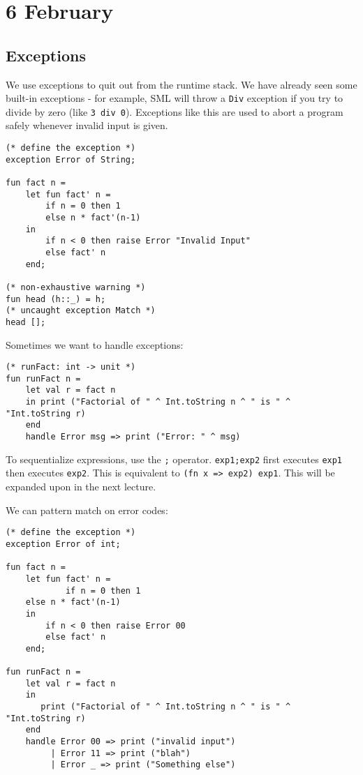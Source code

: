\documentclass[11pt]{article}
\begin{document}
\section{6 February}
\subsection{Exceptions}

We use exceptions to quit out from the runtime stack. We have already seen some built-in exceptions - for example, SML will throw a \verb~Div~ exception if you try to divide by zero (like \verb~3 div 0~). Exceptions like this are used to abort a program safely whenever invalid input is given.

\begin{verbatim}
(* define the exception *)
exception Error of String;

fun fact n =
    let fun fact' n =
        if n = 0 then 1
        else n * fact'(n-1)
    in
        if n < 0 then raise Error "Invalid Input"
        else fact' n
    end;

(* non-exhaustive warning *)
fun head (h::_) = h;
(* uncaught exception Match *)
head []; 
\end{verbatim}

Sometimes we want to handle exceptions:

\begin{verbatim}
(* runFact: int -> unit *)
fun runFact n =
    let val r = fact n
    in print ("Factorial of " ^ Int.toString n ^ " is " ^ "Int.toString r)
    end
    handle Error msg => print ("Error: " ^ msg)
\end{verbatim}

To sequentialize expressions, use the \verb~;~ operator. \verb~exp1;exp2~ first executes \verb~exp1~ then executes \verb~exp2~. This is equivalent to \verb~(fn x => exp2) exp1~. This will be expanded upon in the next lecture.

We can pattern match on error codes:

\begin{verbatim}
(* define the exception *)
exception Error of int;

fun fact n =
    let fun fact' n =
            if n = 0 then 1
    else n * fact'(n-1)
    in
        if n < 0 then raise Error 00
        else fact' n
    end;

fun runFact n =
    let val r = fact n
    in 
       print ("Factorial of " ^ Int.toString n ^ " is " ^ "Int.toString r)
    end
    handle Error 00 => print ("invalid input")
         | Error 11 => print ("blah")
         | Error _ => print ("Something else")
\end{verbatim}
\end{document}
